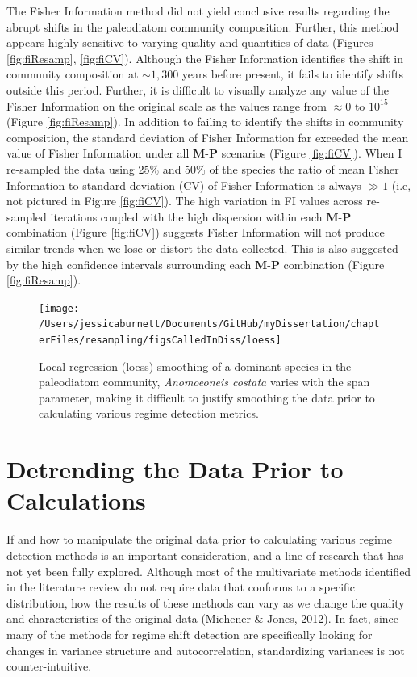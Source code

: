 \documentclass[12pt,twoside,openany]{reedthesis}
\begin{document}
The Fisher Information method did not yield conclusive results regarding the abrupt shifts in the paleodiatom community composition. Further, this method appears highly sensitive to varying quality and quantities of data (Figures \ref{fig:fiResamp}, \ref{fig:fiCV}). Although the Fisher Information identifies the shift in community composition at \(\sim1,300\) years before present, it fails to identify shifts outside this period. Further, it is difficult to visually analyze any value of the Fisher Information on the original scale as the values range from \(\approx 0\) to \(10^{15}\) (Figure \ref{fig:fiResamp}). In addition to failing to identify the shifts in community composition, the standard deviation of Fisher Information far exceeded the mean value of Fisher Information under all \(\textbf{M}\)-\(\textbf{P}\) scenarios (Figure \ref{fig:fiCV}). When I re-sampled the data using 25\% and 50\% of the species the ratio of mean Fisher Information to standard deviation (CV) of Fisher Information is always \(\gg 1\) (i.e, not pictured in Figure \ref{fig:fiCV}). The high variation in FI values across re-sampled iterations coupled with the high dispersion within each \(\textbf{M}\)-\(\textbf{P}\) combination (Figure \ref{fig:fiCV}) suggests Fisher Information will not produce similar trends when we lose or distort the data collected. This is also suggested by the high confidence intervals surrounding each \(\textbf{M}\)-\(\textbf{P}\) combination (Figure \ref{fig:fiResamp}).


\begin{figure}[bth]

{\centering \texttt{[image: /Users/jessicaburnett/Documents/GitHub/myDissertation/chapterFiles/resampling/figsCalledInDiss/loess]} 

}

\caption{Local regression (loess) smoothing of a dominant species in the paleodiatom community, \emph{Anomoeoneis costata} varies with the span parameter, making it difficult to justify smoothing the data prior to calculating various regime detection metrics.}\label{fig:loessEx}
\end{figure}
\hypertarget{detrending-the-data-prior-to-calculations}{%
\section{Detrending the Data Prior to Calculations}\label{detrending-the-data-prior-to-calculations}}

If and how to manipulate the original data prior to calculating various regime detection methods is an important consideration, and a line of research that has not yet been fully explored. Although most of the multivariate methods identified in the literature review do not require data that conforms to a specific distribution, how the results of these methods can vary as we change the quality and characteristics of the original data (Michener \& Jones, \protect\hyperlink{ref-michener2012ecoinformatics}{2012}). In fact, since many of the methods for regime shift detection are specifically looking for changes in variance structure and autocorrelation, standardizing variances is not counter-intuitive.
\end{document}
